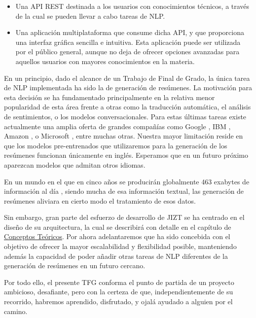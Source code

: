 \vspace*{-0.3cm}

\begin{itemize}
	\item[\textbullet] Una API REST destinada a los usuarios con conocimientos técnicos, a través de la cual se pueden llevar a cabo tareas de NLP.
	\item[\textbullet] Una aplicación multiplataforma que consume dicha API, y que proporciona una interfaz gráfica sencilla e intuitiva. Esta aplicación puede ser utilizada por el público general, aunque no deja de ofrecer opciones avanzadas para aquellos usuarios con mayores conocimientos en la materia.
\end{itemize}

\vspace{-0.3cm}

En un principio, dado el alcance de un Trabajo de Final de Grado, la única tarea de NLP implementada ha sido la de generación de resúmenes. La motivación para esta decisión se ha fundamentado principalmente en la relativa menor popularidad de esta área frente a otras como la traducción automática, el análisis de sentimientos, o los modelos conversacionales. Para estas últimas tareas existe actualmente una amplia oferta de grandes compañías como Google \cite{cloudNL}, IBM \cite{watson}, Amazon \cite{comprehend}, o Microsoft \cite{textAnalytics}, entre muchas otras. Nuestra mayor limitación reside en que los modelos pre-entrenados que utilizaremos para la generación de los resúmenes funcionan únicamente en inglés. Esperamos que en un futuro próximo aparezcan modelos que admitan otros idiomas.

En un mundo en el que en cinco años se producirán globalmente 463 exabytes de información al día \cite{raconteur19}, siendo mucha de esa información textual, las generación de resúmenes aliviara en cierto modo el tratamiento de esos datos.

Sin embargo, gran parte del esfuerzo de desarrollo de JIZT se ha centrado en el diseño de su arquitectura, la cual se describirá con detalle en el capítulo de \hyperref[chapter:conceptos]{Conceptos Teóricos}. Por ahora adelantaremos que ha sido concebida con el objetivo de ofrecer la mayor escalabilidad y flexibilidad posible, manteniendo además la capacidad de poder añadir otras tareas de NLP diferentes de la generación de resúmenes en un futuro cercano.

Por todo ello, el presente TFG conforma el punto de partida de un proyecto ambicioso, desafiante, pero con la certeza de que, independientemente de su recorrido, habremos aprendido, disfrutado, y ojalá ayudado a alguien por el camino.